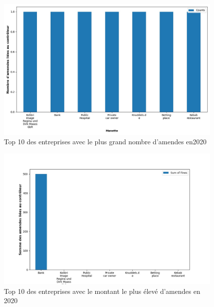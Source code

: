 \documentclass[french]{article}
\begin{document}
\newpage

	
	\begin{multicols}{2}
	\begin{figure}
		[H]\centering\includegraphics[width=1.0\linewidth]{graphs/top10_controller_year}
		\caption{Top 10 des entreprises avec le plus grand nombre d'amendes en2020}
	\end{figure}
	\begin{figure}
		[H]\centering\includegraphics[width=1\linewidth]{graphs/top10_controller_year_fines}
		\caption{Top 10 des entreprises avec le montant le plus élevé d'amendes en 2020}
	 \end{figure}
	
	\end{multicols}
\end{document}
